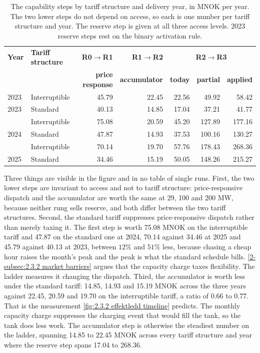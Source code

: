 \begin{table}[htbp]
\centering
\caption{The capability steps by tariff structure and delivery year, in MNOK per year. The two lower steps do not depend on access, so each is one number per tariff structure and year. The reserve step is given at all three access levels. 2023 reserve steps rest on the binary activation rule.}
\small
\begin{tabular}{l l r r r r r}
\toprule
\textbf{Year} & \textbf{Tariff structure} & \textbf{R0$\rightarrow$R1} & \textbf{R1$\rightarrow$R2} & \multicolumn{3}{c}{\textbf{R2$\rightarrow$R3}} \\
 & & \textbf{price response} & \textbf{accumulator} & \textbf{today} & \textbf{partial} & \textbf{applied} \\
\midrule
2023 & Interruptible & 45.79 & 22.45 & 22.56 & 49.92 & 58.42 \\
2023 & Standard & 40.13 & 14.85 & 17.04 & 37.21 & 41.77 \\
\addlinespace
2024 & Interruptible & 75.08 & 20.59 & 45.20 & 127.89 & 177.16 \\
2024 & Standard & 47.87 & 14.93 & 37.53 & 100.16 & 130.27 \\
\addlinespace
2025 & Interruptible & 70.14 & 19.70 & 57.76 & 178.43 & 268.36 \\
2025 & Standard & 34.46 & 15.19 & 50.05 & 148.26 & 215.27 \\
\bottomrule
\end{tabular}
\label{tab:4.2 ladder steps}
\end{table}

Three things are visible in the figure and in no table of single runs. First, the two lower steps are invariant to access and not to tariff structure: price-responsive dispatch and the accumulator are worth the same at 29, 100 and 200 MW, because neither rung sells reserve, and both differ between the two tariff structures. Second, the standard tariff suppresses price-responsive dispatch rather than merely taxing it. The first step is worth 75.08 MNOK on the interruptible tariff and 47.87 on the standard one at 2024, 70.14 against 34.46 at 2025 and 45.79 against 40.13 at 2023, between $12\%$ and $51\%$ less, because chasing a cheap hour raises the month's peak and the peak is what the standard schedule bills. \autoref{2-subsec:2.3.2 market barriers} argues that the capacity charge taxes flexibility. The ladder measures it changing the dispatch. Third, the accumulator is worth less under the standard tariff: 14.85, 14.93 and 15.19 MNOK across the three years against 22.45, 20.59 and 19.70 on the interruptible tariff, a ratio of 0.66 to 0.77. That is the measurement \autoref{fig:2.3.2 effektledd timeline} predicts. The monthly capacity charge suppresses the charging event that would fill the tank, so the tank does less work. The accumulator step is otherwise the steadiest number on the ladder, spanning 14.85 to 22.45 MNOK across every tariff structure and year where the reserve step spans 17.04 to 268.36.

